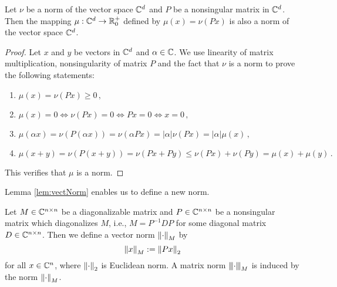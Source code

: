 

\begin{lem}
\label{lem:vectNorm}
Let $\nu$ be a norm of the vector space $\mathbb{C}^d$ and $P$ be a nonsingular matrix in $\mathbb{C}^d$. Then the mapping $\mu:\mathbb{C}^d\rightarrow \mathbb{R}^+_0$ defined by $\mu(x)=\nu(Px)$ is also a norm of the vector space $\mathbb{C}^d$.
\end{lem}
\begin{proof}
Let $x$ and $y$ be vectors in $\mathbb{C}^d$ and $\alpha\in \mathbb{C}$.  We use linearity of matrix multiplication, nonsingularity of matrix $P$ and the fact that $\nu$ is a norm to prove the following statements:
\begin{enumerate}
    \item $\mu(x)=\nu(Px)\geq 0\,,$
    \item $\mu(x)=0 \iff \nu(Px)=0 \iff Px=0 \iff x=0\,,$
    \item $\mu(\alpha x)=\nu(P(\alpha x))=\nu(\alpha Px)=|\alpha|\nu(Px)=|\alpha|\mu(x)\,,$
    \item $\mu(x+y)=\nu(P(x+y))=\nu(Px+Py)\leq \nu(Px)+\nu(Py)=\mu(x)+\mu(y)\,.$
\end{enumerate}
This  verifies that $\mu$ is a norm.
\end{proof}


Lemma \ref{lem:vectNorm} enables us to define a new norm.
\begin{defn}
\label{def:newNorm}
Let $M\in\mathbb{C}^{n\times n}$ be a diagonalizable matrix and $P\in\mathbb{C}^{n\times n}$ be a nonsingular matrix which diagonalizes $M$, i.e., $M=P^{-1}DP$ for some diagonal matrix $D\in\mathbb{C}^{n\times n}$. Then we define a vector norm $\left\lVert\cdot\right\rVert_{M}$ by  
\begin{equation}
\left\lVert x\right\rVert_{M}:=\left\lVert Px\right\rVert_{2}
\end{equation}
for all $x\in\mathbb{C}^n$, where $\left\lVert\cdot\right\rVert_{2}$ is Euclidean norm. A matrix norm ${\left\vert\kern-0.25ex\left\vert\kern-0.25ex\left\vert \cdot\right\vert\kern-0.25ex\right\vert\kern-0.25ex\right\vert}_{M}$ is induced by the norm $\left\lVert\cdot\right\rVert_{M}$.
\end{defn}

 

